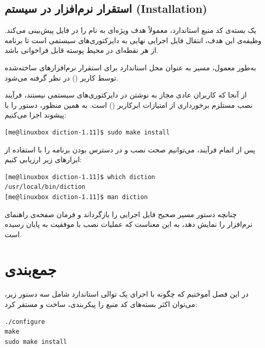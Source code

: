 \subsection{استقرار نرم‌افزار در سیستم (Installation)}

یک بسته‌ی کد منبع استاندارد، معمولاً هدف ویژه‌ای به نام  را در فایل  پیش‌بینی می‌کند. وظیفه‌ی این هدف، انتقال فایل اجرایی نهایی به دایرکتوری‌های سیستمی است تا برنامه از هر نقطه‌ای در محیط پوسته قابل فراخوانی باشد.

به‌طور معمول، مسیر  به عنوان محل استاندارد برای استقرار نرم‌افزارهای ساخته‌شده توسط کاربر () در نظر گرفته می‌شود.

از آنجا که کاربران عادی مجاز به نوشتن در دایرکتوری‌های سیستمی نیستند، فرآیند نصب مستلزم برخورداری از امتیازات ابرکاربر () است. به همین منظور، دستور را با پیشوند  اجرا می‌کنیم:

\begin{latin}
\begin{lstlisting}
[me@linuxbox diction-1.11]$ sudo make install
\end{lstlisting}
\end{latin}

پس از اتمام فرآیند، می‌توانیم صحت نصب و در دسترس بودن برنامه را با استفاده از ابزارهای زیر ارزیابی کنیم:

\begin{latin}
\begin{lstlisting}
[me@linuxbox diction-1.11]$ which diction
/usr/local/bin/diction
[me@linuxbox diction-1.11]$ man diction
\end{lstlisting}
\end{latin}

چنانچه دستور  مسیر صحیح فایل اجرایی را بازگرداند و فرمان  صفحه‌ی راهنمای نرم‌افزار را نمایش دهد، به این معناست که عملیات نصب با موفقیت به پایان رسیده است.

\section{جمع‌بندی}

در این فصل آموختیم که چگونه با اجرای یک توالی استاندارد شامل سه دستور زیر، می‌توان اکثر بسته‌های کد منبع را پیکربندی، ساخت و مستقر کرد:

\begin{latin}
\begin{lstlisting}
./configure
make
sudo make install
\end{lstlisting}
\end{latin}

